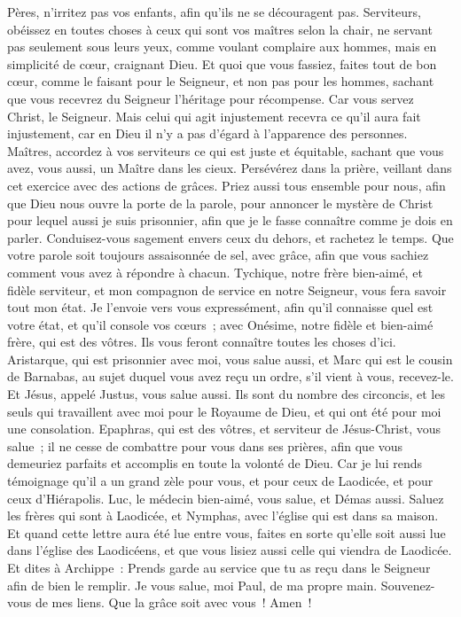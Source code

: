 \begin{multicols}{2}
Pères, n'irritez pas vos enfants, afin qu'ils ne se découragent pas.
Serviteurs, obéissez en toutes choses à ceux qui sont vos maîtres selon la chair, ne servant pas seulement sous leurs yeux, comme voulant complaire aux hommes, mais en simplicité de cœur, craignant Dieu.
Et quoi que vous fassiez, faites tout de bon cœur, comme le faisant pour le Seigneur, et non pas pour les hommes,
sachant que vous recevrez du Seigneur l'héritage pour récompense. Car vous servez Christ, le Seigneur.
Mais celui qui agit injustement recevra ce qu'il aura fait injustement, car en Dieu il n'y a pas d'égard à l'apparence des personnes.
\VerseOne{}Maîtres, accordez à vos serviteurs ce qui est juste et équitable, sachant que vous avez, vous aussi, un Maître dans les cieux.
Persévérez dans la prière, veillant dans cet exercice avec des actions de grâces.
Priez aussi tous ensemble pour nous, afin que Dieu nous ouvre la porte de la parole, pour annoncer le mystère de Christ pour lequel aussi je suis prisonnier, 
afin que je le fasse connaître comme je dois en parler.
Conduisez-vous sagement envers ceux du dehors, et rachetez le temps.
Que votre parole soit toujours assaisonnée de sel, avec grâce, afin que vous sachiez comment vous avez à répondre à chacun.
Tychique, notre frère bien-aimé, et fidèle serviteur, et mon compagnon de service en notre Seigneur, vous fera savoir tout mon état.
Je l'envoie vers vous expressément, afin qu'il connaisse quel est votre état, et qu'il console vos cœurs~;
avec Onésime, notre fidèle et bien-aimé frère, qui est des vôtres. Ils vous feront connaître toutes les choses d'ici.
Aristarque, qui est prisonnier avec moi, vous salue aussi, et Marc qui est le cousin de Barnabas, au sujet duquel vous avez reçu un ordre, s'il vient à vous, recevez-le.
Et Jésus, appelé Justus, vous salue aussi. Ils sont du nombre des circoncis, et les seuls qui travaillent avec moi pour le Royaume de Dieu, et qui ont été pour moi une consolation.
Epaphras, qui est des vôtres, et serviteur de Jésus-Christ, vous salue~; il ne cesse de combattre pour vous dans ses prières, afin que vous demeuriez parfaits et accomplis en toute la volonté de Dieu.
Car je lui rends témoignage qu'il a un grand zèle pour vous, et pour ceux de Laodicée, et pour ceux d'Hiérapolis.
Luc, le médecin bien-aimé, vous salue, et Démas aussi.
Saluez les frères qui sont à Laodicée, et Nymphas, avec l'église qui est dans sa maison.
Et quand cette lettre aura été lue entre vous, faites en sorte qu'elle soit aussi lue dans l'église des Laodicéens, et que vous lisiez aussi celle qui viendra de Laodicée.
Et dites à Archippe~: Prends garde au service que tu as reçu dans le Seigneur afin de bien le remplir.
Je vous salue, moi Paul, de ma propre main. Souvenez-vous de mes liens. Que la grâce soit avec vous~! Amen~!
\PPE{}
\end{multicols}
